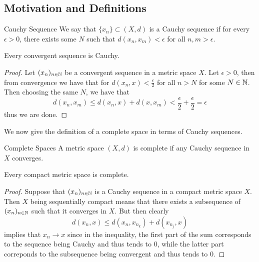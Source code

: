 \documentclass[a4paper]{article}
\begin{document}
\subsection{Motivation and Definitions}
\begin{defn}{Cauchy Sequence}{} We say that $\{x_n\}\subset(X,d)$ is a Cauchy sequence if for every $\epsilon>0$, there exists some $N$ such that $d(x_n,x_m)<\epsilon$ for all $n,m>\epsilon$. 
\end{defn}

\begin{prp}{}{} Every convergent sequence is Cauchy. \tcbline
\begin{proof}
Let $(x_n)_{n\in\mathbb{N}}$ be a convergent sequence in a metric space $X$. Let $\epsilon>0$, then from convergence we have that for $d(x_n,x)<\frac{\epsilon}{2}$ for all $n>N$ for some $N\in\mathbb{N}$. Then choosing the same $N$, we have that $$d(x_n,x_m)\leq d(x_n,x)+d(x,x_m)<\frac{\epsilon}{2}+\frac{\epsilon}{2}=\epsilon$$ thus we are done. 
\end{proof}
\end{prp}

We now give the definition of a complete space in terms of Cauchy sequences. 

\begin{defn}{Complete Spaces}{} A metric space $(X,d)$ is complete if any Cauchy sequence in $X$ converges. 
\end{defn}

\begin{prp}{}{} Every compact metric space is complete. \tcbline
\begin{proof}
Suppose that $(x_n)_{n\in\mathbb{N}}$ is a Cauchy sequence in a compact metric space $X$. Then $X$ being sequentially compact means that there exists a subsequence of $(x_n)_{n\in\mathbb{N}}$ such that it converges in $X$. But then clearly $$d(x_n,x)\leq d(x_n,x_{n_k})+d(x_{n_j},x)$$ implies that $x_n\to x$ since in the inequality, the first part of the sum corresponds to the sequence being Cauchy and thus tends to $0$, while the latter part correponds to the subsequence being convergent and thus tends to $0$. 
\end{proof}
\end{prp}
\end{document}
